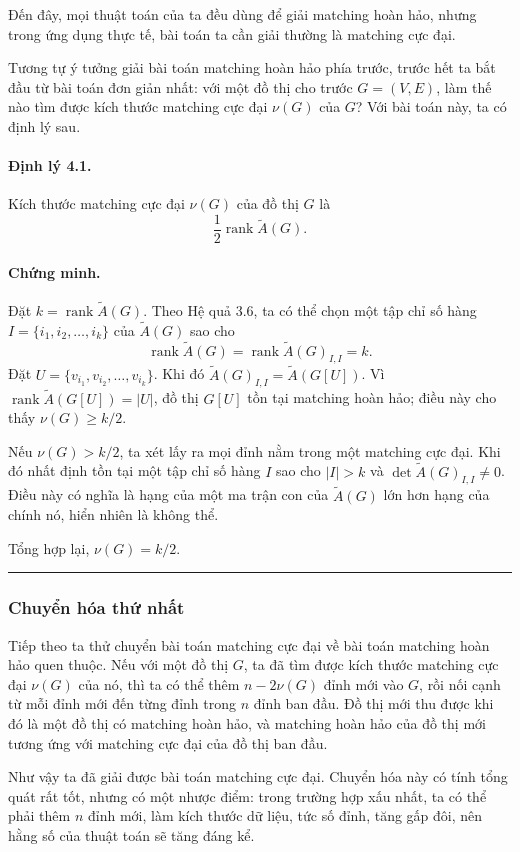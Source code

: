 \documentclass[11pt]{article}
\newcommand{\rank}{\operatorname{rank}}
\newcommand{\qedmark}{\hfill\rule{0.7ex}{0.7ex}}
\begin{document}
Đến đây, mọi thuật toán của ta đều dùng để giải matching hoàn hảo, nhưng trong
ứng dụng thực tế, bài toán ta cần giải thường là matching cực đại.

Tương tự ý tưởng giải bài toán matching hoàn hảo phía trước, trước hết ta bắt
đầu từ bài toán đơn giản nhất: với một đồ thị cho trước \(G=(V,E)\), làm thế
nào tìm được kích thước matching cực đại \(\nu(G)\) của \(G\)? Với bài toán
này, ta có định lý sau.

\paragraph{Định lý 4.1.}
Kích thước matching cực đại \(\nu(G)\) của đồ thị \(G\) là
\[
  \frac{1}{2}\rank\tilde A(G).
\]

\paragraph{Chứng minh.}
Đặt \(k=\rank\tilde A(G)\). Theo Hệ quả 3.6, ta có thể chọn một tập chỉ số
hàng \(I=\{i_1,i_2,\ldots,i_k\}\) của \(\tilde A(G)\) sao cho
\[
  \rank\tilde A(G)=\rank\tilde A(G)_{I,I}=k.
\]
Đặt \(U=\{v_{i_1},v_{i_2},\ldots,v_{i_k}\}\). Khi đó
\(\tilde A(G)_{I,I}=\tilde A(G[U])\). Vì
\(\rank\tilde A(G[U])=|U|\), đồ thị \(G[U]\) tồn tại matching hoàn hảo; điều
này cho thấy \(\nu(G)\ge k/2\).

Nếu \(\nu(G)>k/2\), ta xét lấy ra mọi đỉnh nằm trong một matching cực đại. Khi
đó nhất định tồn tại một tập chỉ số hàng \(I\) sao cho \(|I|>k\) và
\(\det\tilde A(G)_{I,I}\ne 0\). Điều này có nghĩa là hạng của một ma trận con
của \(\tilde A(G)\) lớn hơn hạng của chính nó, hiển nhiên là không thể.

Tổng hợp lại, \(\nu(G)=k/2\). \qedmark

\subsubsection{Chuyển hóa thứ nhất}

Tiếp theo ta thử chuyển bài toán matching cực đại về bài toán matching hoàn
hảo quen thuộc. Nếu với một đồ thị \(G\), ta đã tìm được kích thước matching
cực đại \(\nu(G)\) của nó, thì ta có thể thêm \(n-2\nu(G)\) đỉnh mới vào
\(G\), rồi nối cạnh từ mỗi đỉnh mới đến từng đỉnh trong \(n\) đỉnh ban đầu.
Đồ thị mới thu được khi đó là một đồ thị có matching hoàn hảo, và matching
hoàn hảo của đồ thị mới tương ứng với matching cực đại của đồ thị ban đầu.

Như vậy ta đã giải được bài toán matching cực đại. Chuyển hóa này có tính tổng
quát rất tốt, nhưng có một nhược điểm: trong trường hợp xấu nhất, ta có thể
phải thêm \(n\) đỉnh mới, làm kích thước dữ liệu, tức số đỉnh, tăng gấp đôi,
nên hằng số của thuật toán sẽ tăng đáng kể.
\end{document}

